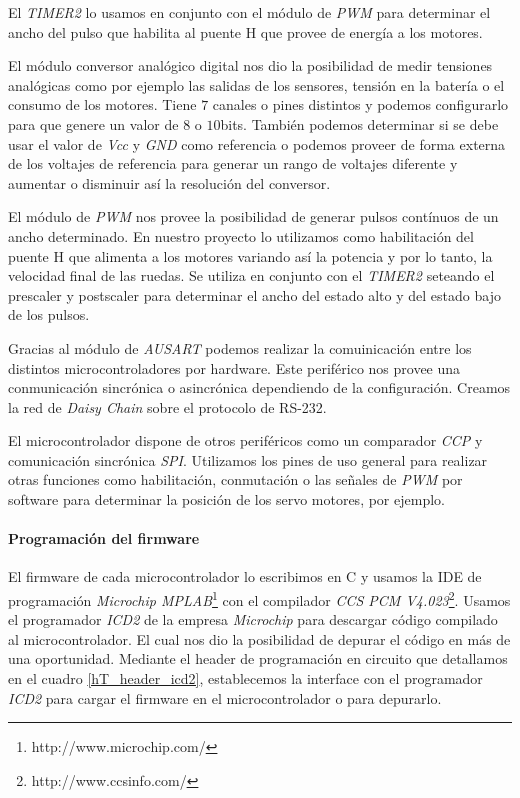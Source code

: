 El \emph{TIMER2} lo usamos en conjunto con el m\'odulo de \emph{PWM} para determinar el ancho del pulso que habilita al puente H
que provee de energ\'ia a los motores.

El m\'odulo conversor anal\'ogico digital nos dio la posibilidad de medir tensiones anal\'ogicas como por ejemplo
las salidas de los sensores, tensi\'on en la bater\'ia o el consumo de los motores.
Tiene $7$ canales o pines distintos y podemos configurarlo para que genere un valor de $8$ o $10$bits.
Tambi\'en podemos determinar si se debe usar el valor de \emph{Vcc} y \emph{GND} como referencia o podemos proveer
de forma externa de los voltajes de referencia para generar un rango de voltajes diferente y aumentar o disminuir
as\'i la resoluci\'on del conversor.

El m\'odulo de \emph{PWM} nos provee la posibilidad de generar pulsos cont\'inuos de un ancho determinado.
En nuestro proyecto lo utilizamos como habilitaci\'on del puente H que alimenta a los motores variando as\'i la
potencia y por lo tanto, la velocidad final de las ruedas.
Se utiliza en conjunto con el \emph{TIMER2} seteando el prescaler y postscaler para determinar el ancho del
estado alto y del estado bajo de los pulsos.

Gracias al m\'odulo de \emph{AUSART} podemos realizar la comuinicaci\'on entre los distintos microcontroladores por hardware.
Este perif\'erico nos provee una conmunicaci\'on sincr\'onica o asincr\'onica dependiendo de la configuraci\'on.
Creamos la red de \emph{Daisy Chain} sobre el protocolo de RS-232.

El microcontrolador dispone de otros perif\'ericos como un comparador \emph{CCP} y comunicaci\'on sincr\'onica \emph{SPI}.
Utilizamos los pines de uso general para realizar otras funciones como habilitaci\'on, conmutaci\'on o las se\~nales de
\emph{PWM} por software para determinar la posici\'on de los servo motores, por ejemplo.

\paragraph{Programaci\'on del firmware}
\label{h_controlador_micro_programacion}

El firmware de cada microcontrolador lo escribimos en C y usamos la IDE de programaci\'on 
\emph{Microchip MPLAB}\footnote{http://www.microchip.com/} con el compilador \emph{CCS PCM V4.023}\footnote{http://www.ccsinfo.com/}.
Usamos el programador \emph{ICD2} de la empresa \emph{Microchip} para descargar c\'odigo compilado al microcontrolador.
El cual nos dio la posibilidad de depurar el c\'odigo en m\'as de una oportunidad.
Mediante el header de programaci\'on en circuito que detallamos en el cuadro \ref{hT_header_icd2}, establecemos la
interface con el programador \emph{ICD2} para cargar el firmware en el microcontrolador o para depurarlo.

